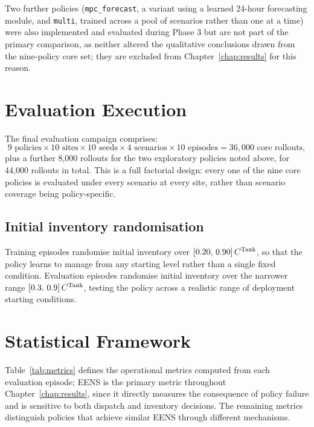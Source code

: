 Two further policies (\texttt{mpc\_forecast}, a variant using a learned
24-hour forecasting module, and \texttt{multi}, trained across a pool of
scenarios rather than one at a time) were also implemented and
evaluated during Phase 3 but are not part of the primary comparison, as
neither altered the qualitative conclusions drawn from the nine-policy
core set; they are excluded from Chapter~\ref{chap:results} for this
reason.


\section{Evaluation Execution}
\label{sec:eval_execution}

The final evaluation campaign comprises:
\[
9 \text{ policies} \times 10 \text{ sites} \times 10 \text{ seeds}
\times 4 \text{ scenarios} \times 10 \text{ episodes} =
36{,}000 \text{ core rollouts},
\]
plus a further 8{,}000 rollouts for the two exploratory policies noted
above, for 44{,}000 rollouts in total. This is a full factorial design:
every one of the nine core policies is evaluated under every scenario at
every site, rather than scenario coverage being policy-specific.

\subsection{Initial inventory randomisation}

Training episodes randomise initial inventory over
$[0.20,\,0.90]\,C^{\mathrm{Tank}}$, so that the policy learns to manage from any
starting level rather than a single fixed condition. Evaluation episodes
randomise initial inventory over the narrower range
$[0.3,\,0.9]\,C^{\mathrm{Tank}}$, testing the policy across a realistic range of
deployment starting conditions.


\section{Statistical Framework}
\label{sec:metrics}

Table~\ref{tab:metrics} defines the operational metrics computed from
each evaluation episode; EENS is the primary metric throughout
Chapter~\ref{chap:results}, since it directly measures the consequence
of policy failure and is sensitive to both dispatch and inventory
decisions. The remaining metrics distinguish policies that achieve
similar EENS through different mechanisms.

